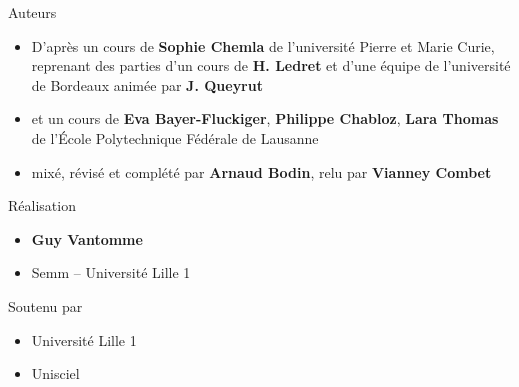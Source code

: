 \begin{frame}
\begin{minipage}{0.90\textwidth}
   \smallskip
   
  Auteurs
  \begin{itemize}
    \item D'après un cours de {\bf Sophie Chemla} de l'université Pierre et Marie Curie,  
  reprenant des parties d'un cours de {\bf H. Ledret} et d'une équipe de l'université de 
  Bordeaux animée par {\bf J. Queyrut}
  
  \item et un cours de {\bf Eva Bayer-Fluckiger}, {\bf Philippe Chabloz}, {\bf Lara Thomas}
  de l'\'Ecole Polytechnique Fédérale de Lausanne


  
  \item mixé, révisé et complété par {\bf Arnaud Bodin}, relu par {\bf Vianney Combet}
  
  
  \end{itemize}

  \smallskip

  Réalisation
  \begin{itemize}
    \item {\bf Guy Vantomme}
    \item Semm -- Université Lille 1
  \end{itemize}

  \smallskip

  Soutenu par 
  \begin{itemize}
    \item Université Lille 1
    \item Unisciel
  \end{itemize}

  \end{minipage}  



\end{frame}


